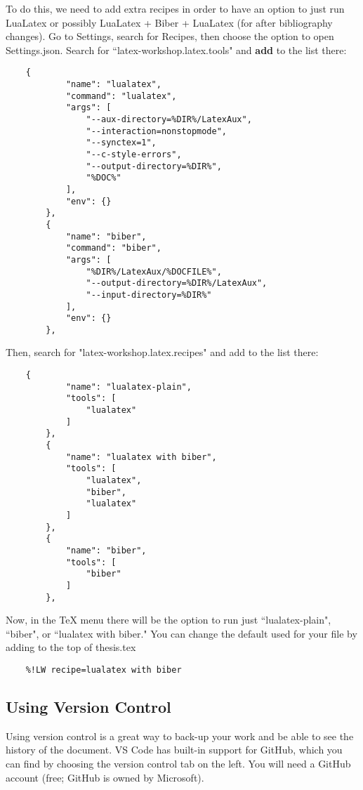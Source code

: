 \documentclass{article}
\begin{document}
To do this, we need to add extra recipes in order to have an option to just run LuaLatex or possibly LuaLatex + Biber + LuaLatex (for after bibliography changes).
Go to Settings, search for Recipes, then choose the option to open Settings.json.
Search for ``latex-workshop.latex.tools" and \textbf{add} to the list there:
\begin{verbatim}
    {
            "name": "lualatex",
            "command": "lualatex",
            "args": [
                "--aux-directory=%DIR%/LatexAux",
                "--interaction=nonstopmode",
                "--synctex=1",
                "--c-style-errors",
                "--output-directory=%DIR%",
                "%DOC%"
            ],
            "env": {}
        },
        {
            "name": "biber",
            "command": "biber",
            "args": [
                "%DIR%/LatexAux/%DOCFILE%",
                "--output-directory=%DIR%/LatexAux",
                "--input-directory=%DIR%"
            ],
            "env": {}
        },
\end{verbatim}

Then, search for "latex-workshop.latex.recipes" and add to the list there:
\begin{samepage}
    \begin{verbatim}
    {
            "name": "lualatex-plain",
            "tools": [
                "lualatex"
            ]
        },
        {
            "name": "lualatex with biber",
            "tools": [
                "lualatex",
                "biber",
                "lualatex"
            ]
        },
        {
            "name": "biber",
            "tools": [
                "biber"
            ]
        },
\end{verbatim}
\end{samepage}

Now, in the TeX menu there will be the option to run just ``lualatex-plain", ``biber", or ``lualatex with biber."
You can change the default used for your file by adding to the top of thesis.tex
\begin{verbatim}
    %!LW recipe=lualatex with biber
\end{verbatim}

\subsection{Using Version Control}
Using version control is a great way to back-up your work and be able to see the history of the document.
VS Code has built-in support for GitHub, which you can find by choosing the version control tab on the left.
You will need a GitHub account (free; GitHub is owned by Microsoft).
\end{document}
